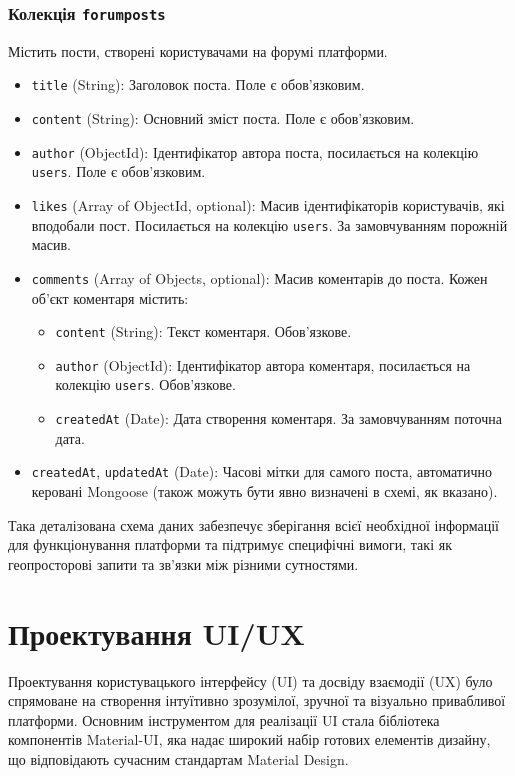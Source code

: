 \subsubsection*{Колекція \texttt{forumposts}}
Містить пости, створені користувачами на форумі платформи.
\begin{itemize}
    \item \texttt{title} (String): Заголовок поста. Поле є обов'язковим.
    \item \texttt{content} (String): Основний зміст поста. Поле є обов'язковим.
    \item \texttt{author} (ObjectId): Ідентифікатор автора поста, посилається на колекцію \texttt{users}. Поле є обов'язковим.
    \item \texttt{likes} (Array of ObjectId, optional): Масив ідентифікаторів користувачів, які вподобали пост. Посилається на колекцію \texttt{users}. За замовчуванням порожній масив.
    \item \texttt{comments} (Array of Objects, optional): Масив коментарів до поста. Кожен об'єкт коментаря містить:
    \begin{itemize}
        \item \texttt{content} (String): Текст коментаря. Обов'язкове.
        \item \texttt{author} (ObjectId): Ідентифікатор автора коментаря, посилається на колекцію \texttt{users}. Обов'язкове.
        \item \texttt{createdAt} (Date): Дата створення коментаря. За замовчуванням поточна дата.
    \end{itemize}
    \item \texttt{createdAt}, \texttt{updatedAt} (Date): Часові мітки для самого поста, автоматично керовані Mongoose (також можуть бути явно визначені в схемі, як вказано).
\end{itemize}
Така деталізована схема даних забезпечує зберігання всієї необхідної інформації для функціонування платформи та підтримує специфічні вимоги, такі як геопросторові запити та зв'язки між різними сутностями.


\section{Проектування UI/UX}
\label{sec:ui_ux}
Проектування користувацького інтерфейсу (UI) та досвіду взаємодії (UX) було спрямоване на створення інтуїтивно зрозумілої, зручної та візуально привабливої платформи. Основним інструментом для реалізації UI стала бібліотека компонентів Material-UI, яка надає широкий набір готових елементів дизайну, що відповідають сучасним стандартам Material Design. 

